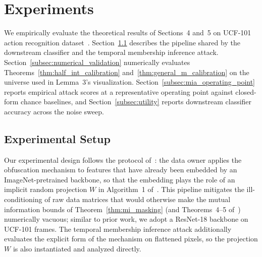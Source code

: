 \documentclass[letterpaper]{article} %
\begin{document}
\section{Experiments}
\label{sec:experiments}

We empirically evaluate the theoretical results of Sections~4 and~5 on UCF-101 action recognition dataset~\cite{soomro2012ucf101}. Section~\ref{subsec:exp_setup} describes the pipeline shared by the downstream classifier and the temporal membership inference attack. Section~\ref{subsec:numerical_validation} numerically evaluates Theorems~\ref{thm:half_int_calibration} and~\ref{thm:general_m_calibration} on the universe used in Lemma~3's visualization. Section~\ref{subsec:mia_operating_point} reports empirical attack scores at a representative operating point against closed-form chance baselines, and Section~\ref{subsec:utility} reports downstream classifier accuracy across the noise sweep.

\subsection{Experimental Setup}
\label{subsec:exp_setup}

Our experimental design follows the protocol of~\cite{xiao2024formal}: the data owner applies the obfuscation mechanism to features that have already been embedded by an ImageNet-pretrained backbone, so that the embedding plays the role of an implicit random projection $W$ in Algorithm~1 of~\cite{xiao2024formal}. This pipeline mitigates the ill-conditioning of raw data matrices that would otherwise make the mutual information bounds of Theorem~\ref{thm:mi_masking} (and Theorems~4--5 of~\cite{xiao2024formal}) numerically vacuous; similar to prior work, we adopt a ResNet-18 backbone on UCF-101 frames. The temporal membership inference attack additionally evaluates the explicit form of the mechanism on flattened pixels, so the projection $W$ is also instantiated and analyzed directly.
\end{document}
